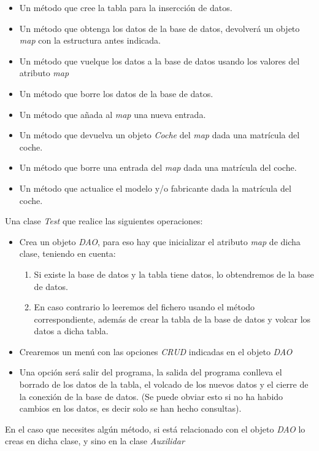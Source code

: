 \documentclass[4paper]{article}
\begin{document}
\begin{itemize}
\item Un método que cree la tabla para la insercción de datos.
\item Un método que obtenga los datos de la base de datos, devolverá un objeto \emph{map} con la estructura antes indicada.
\item Un método que vuelque los datos a la base de datos usando los valores del atributo \emph{map}
\item Un método que borre los datos de la base de datos.
\item Un método que añada al \emph{map} una nueva entrada.
\item Un método que devuelva un objeto \emph{Coche} del \emph{map} dada una matrícula del coche.
\item Un método que borre una entrada del \emph{map} dada una matrícula del coche.
\item Un método que actualice el modelo y/o fabricante dada la matrícula del coche.
\end{itemize}
Una clase \emph{Test} que realice las siguientes operaciones:
\begin{itemize}
\item Crea un objeto \emph{DAO}, para eso hay que inicializar el atributo \emph{map} de dicha clase, teniendo en cuenta:
\begin{enumerate}
\item Si existe la base de datos y la tabla tiene datos, lo obtendremos de la base de datos.
\item En caso contrario lo leeremos del fichero usando el método correspondiente, además de crear la tabla de la base de datos y volcar los datos a dicha tabla.
\end{enumerate}
\item Crearemos un menú con las opciones \emph{CRUD} indicadas en el objeto \emph{DAO}
\item Una opción será salir del programa, la salida del programa conlleva el borrado de los datos de la tabla, el volcado de los nuevos datos y el cierre de la conexión de la base de datos. (Se puede obviar esto si no ha habido cambios en los datos, es decir solo se han hecho consultas).
\end{itemize}
En el caso que necesites algún método, si está relacionado con el objeto \emph{DAO} lo creas en dicha clase, y sino en la clase \emph{Auxilidar}
\end{document}
